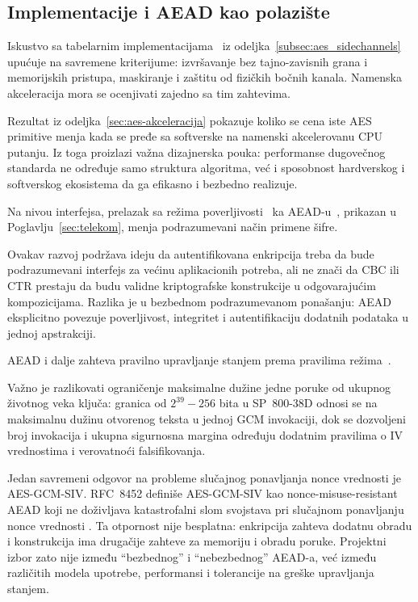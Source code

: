 \subsection{Implementacije i AEAD kao polazište}

Iskustvo sa tabelarnim implementacijama~\cite{OsvikShamirTromer2006}
iz odeljka~\ref{subsec:aes_sidechannels} upućuje na savremene kriterijume:
izvršavanje bez tajno-zavisnih grana i memorijskih pristupa, maskiranje
i zaštitu od fizičkih bočnih kanala. Namenska akceleracija mora se
ocenjivati zajedno sa tim zahtevima.

Rezultat iz odeljka~\ref{sec:aes-akceleracija} pokazuje koliko se cena
iste AES primitive menja kada se pređe sa softverske na namenski
akcelerovanu CPU putanju. Iz toga proizlazi važna dizajnerska pouka:
performanse dugovečnog standarda ne određuje samo struktura algoritma,
već i sposobnost hardverskog i softverskog ekosistema da ga efikasno i
bezbedno realizuje.

Na nivou interfejsa, prelazak sa režima poverljivosti~\cite{Dworkin2001Modes}
ka AEAD-u~\cite{RFC5116,rfc8446,rfc9325}, prikazan u
Poglavlju~\ref{sec:telekom}, menja podrazumevani način primene šifre.

Ovakav razvoj podržava ideju da autentifikovana enkripcija treba da bude
podrazumevani interfejs za većinu aplikacionih potreba, ali ne znači da
CBC ili CTR prestaju da budu validne kriptografske konstrukcije u
odgovarajućim kompozicijama. Razlika je u bezbednom podrazumevanom
ponašanju: AEAD eksplicitno povezuje poverljivost, integritet i
autentifikaciju dodatnih podataka u jednoj apstrakciji.

AEAD i dalje zahteva pravilno upravljanje stanjem prema pravilima
režima~\cite{Dworkin2007GCM}.

Važno je razlikovati
ograničenje maksimalne dužine jedne poruke od ukupnog životnog veka
ključa: granica od $2^{39}-256$ bita u SP~800-38D odnosi se na maksimalnu
dužinu otvorenog teksta u jednoj GCM invokaciji, dok se dozvoljeni broj
invokacija i ukupna sigurnosna margina određuju dodatnim pravilima o IV
vrednostima i verovatnoći falsifikovanja.

Jedan savremeni odgovor na probleme slučajnog ponavljanja nonce vrednosti
je AES-GCM-SIV. RFC~8452 definiše AES-GCM-SIV kao nonce-misuse-resistant
AEAD koji ne doživljava katastrofalni slom svojstava pri slučajnom
ponavljanju nonce vrednosti \cite{RFC8452}. Ta otpornost nije besplatna:
enkripcija zahteva dodatnu obradu i konstrukcija ima drugačije zahteve
za memoriju i obradu poruke. Projektni izbor zato nije između
``bezbednog'' i ``nebezbednog'' AEAD-a, već između različitih modela
upotrebe, performansi i tolerancije na greške upravljanja stanjem.


